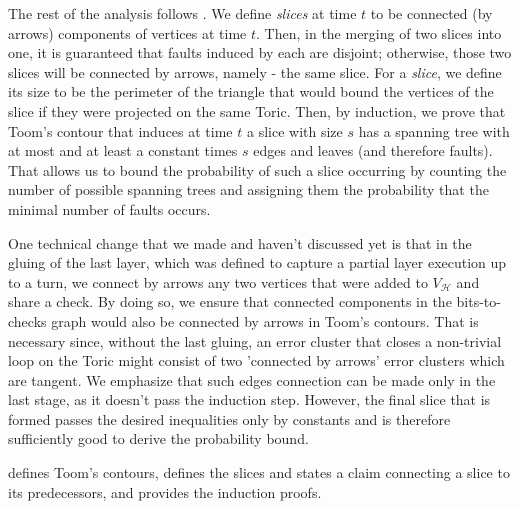 The rest of the analysis follows \cite{Berman}. We define \textit{slices} at time $t$ to be connected (by arrows) components of vertices at time $t$. Then, in the merging of two slices into one, it is guaranteed that faults induced by each are disjoint; otherwise, those two slices will be connected by arrows, namely - the same slice. For a \textit{slice}, we define its size to be the perimeter of the triangle that would bound the vertices of the slice if they were projected on the same Toric. Then, by induction, we prove that Toom's contour that induces at time $t$ a slice with size $s$ has a spanning tree with at most and at least a constant times $s$ edges and leaves (and therefore faults). That allows us to bound the probability of such a slice occurring by counting the number of possible spanning trees and assigning them the probability that the minimal number of faults occurs.

One technical change that we made and haven't discussed yet is that in the gluing of the last layer, which was defined to capture a partial layer execution up to a turn, we connect by arrows any two vertices that were added to $ V_{\mathcal{H}} $ and share a check. By doing so, we ensure that connected components in the bits-to-checks graph would also be connected by arrows in Toom's contours. That is necessary since, without the last gluing, an error cluster that closes a non-trivial loop on the Toric might consist of two 'connected by arrows' error clusters which are tangent.
We emphasize that such edges connection can be made only in the last stage, as it doesn't pass the induction step. However, the final slice that is formed passes the desired inequalities only by constants and is therefore sufficiently good to derive the probability bound.

 defines Toom's contours,  defines the slices and states a claim connecting a slice to its predecessors, and  provides the induction proofs.





